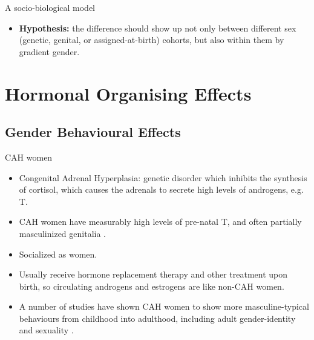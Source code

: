 \documentclass[hyperref={pdfpagelabels=false}]{beamer}
\begin{document}
\begin{frame}{A socio-biological model}
	\begin{itemize}
	\item \textbf{Hypothesis:} the difference should show up not only between different sex (genetic, genital, or assigned-at-birth) cohorts, but also within them by gradient gender.
	\end{itemize}
\end{frame}







\section{Hormonal Organising Effects}

\subsection{Gender Behavioural Effects}

\begin{frame}{CAH women}
	\begin{itemize}
	\item Congenital Adrenal Hyperplasia: genetic disorder which inhibits the synthesis of cortisol, which causes the adrenals to secrete high levels of androgens, e.g. T.
	\item CAH women have measurably high levels of pre-natal T, and often partially masculinized genitalia \citep[][and refs therein]{pasterskietal2005, balthazart2011}.
	\item Socialized as women.
	\item Usually receive hormone replacement therapy and other treatment upon birth, so circulating androgens and estrogens are like non-CAH women.
	\item A number of studies have shown CAH women to show more masculine-typical behaviours from childhood into adulthood, including adult gender-identity and sexuality \citep[see][for reviews]{hines2006, balthazart2011}.
	\end{itemize}
\end{frame}
\end{document}
